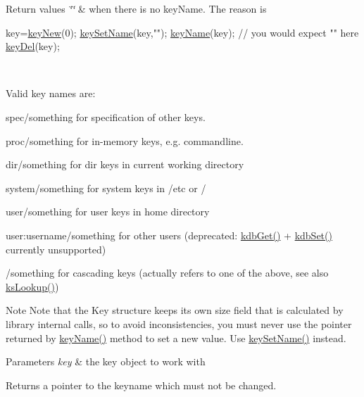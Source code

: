 \begin{DoxyRetVals}{Return values}
{\em \char`\"{}\char`\"{}} & when there is no key\+Name. The reason is 
\begin{DoxyCode}
key=\hyperlink{group__key_gad23c65b44bf48d773759e1f9a4d43b89}{keyNew}(0);
\hyperlink{group__keyname_ga7699091610e7f3f43d2949514a4b35d9}{keySetName}(key,\textcolor{stringliteral}{""});
\hyperlink{group__keyname_ga8e805c726a60da921d3736cda7813513}{keyName}(key); \textcolor{comment}{// you would expect "" here}
\hyperlink{group__key_ga3df95bbc2494e3e6703ece5639be5bb1}{keyDel}(key);
\end{DoxyCode}
\\
\hline
\end{DoxyRetVals}
Valid key names are\+:


\begin{DoxyItemize}
\item {\ttfamily spec/something} for specification of other keys.
\item {\ttfamily proc/something} for in-\/memory keys, e.\+g. commandline.
\item {\ttfamily dir/something} for dir keys in current working directory
\item {\ttfamily system/something} for system keys in /etc or /
\item {\ttfamily user/something} for user keys in home directory
\item {\ttfamily user\+:username/something} for other users (deprecated\+: \hyperlink{group__kdb_ga28e385fd9cb7ccfe0b2f1ed2f62453a1}{kdb\+Get()} + \hyperlink{group__kdb_ga11436b058408f83d303ca5e996832bcf}{kdb\+Set()} currently unsupported)
\item {\ttfamily /something} for cascading keys (actually refers to one of the above, see also \hyperlink{group__keyset_gaa34fc43a081e6b01e4120daa6c112004}{ks\+Lookup()})

\begin{DoxyNote}{Note}
Note that the Key structure keeps its own size field that is calculated by library internal calls, so to avoid inconsistencies, you must never use the pointer returned by \hyperlink{group__keyname_ga8e805c726a60da921d3736cda7813513}{key\+Name()} method to set a new value. Use \hyperlink{group__keyname_ga7699091610e7f3f43d2949514a4b35d9}{key\+Set\+Name()} instead.
\end{DoxyNote}

\begin{DoxyParams}{Parameters}
{\em key} & the key object to work with \\
\hline
\end{DoxyParams}
\begin{DoxyReturn}{Returns}
a pointer to the keyname which must not be changed. 
\end{DoxyReturn}


\end{DoxyItemize}
